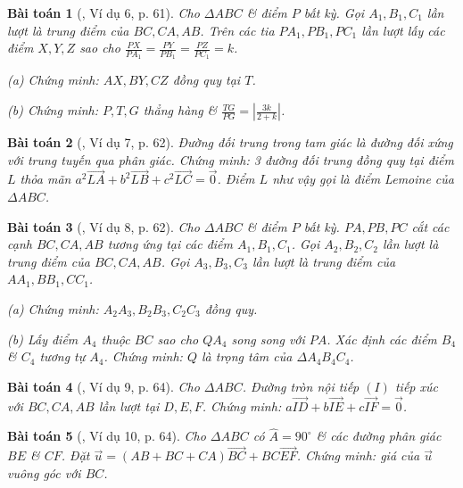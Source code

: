 \documentclass{article}
\numberwithin{equation}{section}
\newtheorem{baitoan}{Bài toán}[section]
\begin{document}
\begin{baitoan}[\cite{Hai_Hung_Thu_Tung2022_tap_1}, Ví dụ 6, p. 61]
	Cho $\Delta ABC$ \& điểm $P$ bất kỳ. Gọi $A_1,B_1,C_1$ lần lượt là trung điểm của $BC,CA,AB$. Trên các tia $PA_1,PB_1,PC_1$ lần lượt lấy các điểm $X,Y,Z$ sao cho $\frac{PX}{PA_1} = \frac{PY}{PB_1} = \frac{PZ}{PC_1} = k$.
	\begin{enumerate*}
		\item[(a)] Chứng minh: $AX,BY,CZ$ đồng quy tại $T$.
		\item[(b)] Chứng minh: $P,T,G$ thẳng hàng \& $\frac{TG}{PG} = \left|\frac{3k}{2 + k}\right|$.
	\end{enumerate*}
\end{baitoan}

\begin{baitoan}[\cite{Hai_Hung_Thu_Tung2022_tap_1}, Ví dụ 7, p. 62]
	Đường đối trung trong tam giác là đường đối xứng với trung tuyến qua phân giác. Chứng minh: 3 đường đối trung đồng quy tại điểm $L$ thỏa mãn $a^2\overrightarrow{LA} + b^2\overrightarrow{LB} + c^2\overrightarrow{LC} = \vec{0}$. Điểm $L$ như vậy gọi là \emph{điểm Lemoine} của $\Delta ABC$.
\end{baitoan}

\begin{baitoan}[\cite{Hai_Hung_Thu_Tung2022_tap_1}, Ví dụ 8, p. 62]
	Cho $\Delta ABC$ \& điểm $P$ bất kỳ. $PA,PB,PC$ cắt các cạnh $BC,CA,AB$ tương ứng tại các điểm $A_1,B_1,C_1$. Gọi $A_2,B_2,C_2$ lần lượt là trung điểm của $BC,CA,AB$. Gọi $A_3,B_3,C_3$ lần lượt là trung điểm của $AA_1,BB_1,CC_1$.
	\begin{enumerate*}
		\item[(a)] Chứng minh: $A_2A_3,B_2B_3,C_2C_3$ đồng quy.
		\item[(b)] Lấy điểm $A_4$ thuộc $BC$ sao cho $QA_4$ song song với $PA$. Xác định các điểm $B_4$ \& $C_4$ tương tự $A_4$. Chứng minh: $Q$ là trọng tâm của $\Delta A_4B_4C_4$.
	\end{enumerate*}
\end{baitoan}

\begin{baitoan}[\cite{Hai_Hung_Thu_Tung2022_tap_1}, Ví dụ 9, p. 64]
	Cho $\Delta ABC$. Đường tròn nội tiếp $(I)$ tiếp xúc với $BC,CA,AB$ lần lượt tại $D,E,F$. Chứng minh: $a\overrightarrow{ID} + b\overrightarrow{IE} + c\overrightarrow{IF} = \vec{0}$.
\end{baitoan}

\begin{baitoan}[\cite{Hai_Hung_Thu_Tung2022_tap_1}, Ví dụ 10, p. 64]
	Cho $\Delta ABC$ có $\widehat{A} = 90^\circ$ \& các đường phân giác $BE$ \& $CF$. Đặt $\vec{u} = (AB + BC + CA)\overrightarrow{BC} + BC\overrightarrow{EF}$. Chứng minh: giá của $\vec{u}$ vuông góc với $BC$.
\end{baitoan}
\end{document}
